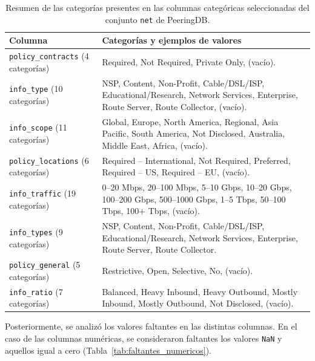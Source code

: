 \begin{table}[H]
\centering
\caption{Resumen de las categorías presentes en las columnas categóricas seleccionadas del conjunto \texttt{net} de PeeringDB.}
\label{tab:categorias_peeringdb_clara}
\begin{tabularx}{\textwidth}{lX}
\hline
\textbf{Columna} & \textbf{Categorías y ejemplos de valores} \\
\hline

\texttt{policy\_contracts} (4 categorías) &
Required, Not Required, Private Only, (vacío). \\

\texttt{info\_type} (10 categorías) &
NSP, Content, Non-Profit, Cable/DSL/ISP, Educational/Research, 
Network Services, Enterprise, Route Server, Route Collector, (vacío). \\

\texttt{info\_scope} (11 categorías) &
Global, Europe, North America, Regional, Asia Pacific, South America, 
Not Disclosed, Australia, Middle East, Africa, (vacío). \\

\texttt{policy\_locations} (6 categorías) &
Required – International, Not Required, Preferred, Required – US, Required – EU, (vacío). \\

\texttt{info\_traffic} (19 categorías) &
0–20 Mbps, 20–100 Mbps, 5–10 Gbps, 10–20 Gbps, 100–200 Gbps, 500–1000 Gbps, 
1–5 Tbps, 50–100 Tbps, 100+ Tbps, (vacío). \\

\texttt{info\_types} (9 categorías) &
NSP, Content, Non-Profit, Cable/DSL/ISP, Educational/Research, 
Network Services, Enterprise, Route Server, Route Collector. \\

\texttt{policy\_general} (5 categorías) &
Restrictive, Open, Selective, No, (vacío). \\

\texttt{info\_ratio} (7 categorías) &
Balanced, Heavy Inbound, Heavy Outbound, Mostly Inbound, 
Mostly Outbound, Not Disclosed, (vacío). \\

\hline
\end{tabularx}
\end{table}



Posteriormente, se analizó los valores faltantes en las distintas columnas.  
En el caso de las columnas numéricas, se consideraron faltantes los valores \texttt{NaN} y aquellos igual a cero (Tabla~\ref{tab:faltantes_numericos}).


